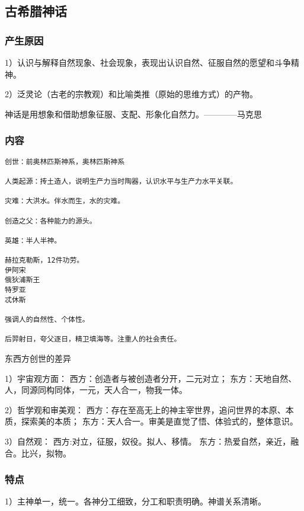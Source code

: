 \documentclass[UTF8]{../RepresentationUniverse}
\begin{document}
\subsection{古希腊神话}

\subsubsection{产生原因}

1）认识与解释自然现象、社会现象，表现出认识自然、征服自然的愿望和斗争精神。

2）泛灵论（古老的宗教观）和比喻类推（原始的思维方式）的产物。

神话是用想象和借助想象征服、支配、形象化自然力。————马克思


\subsubsection{内容}

\begin{lstlisting}
创世：前奥林匹斯神系，奥林匹斯神系

人类起源：抟土造人，说明生产力当时陶器，认识水平与生产力水平关联。

灾难：大洪水。伴水而生，水的灾难。

创造之父：各种能力的源头。

英雄：半人半神。

赫拉克勒斯，12件功劳。
伊阿宋
俄狄浦斯王
特罗亚
忒休斯

强调人的自然性、个体性。

后羿射日，夸父逐日，精卫填海等。注重人的社会责任。
\end{lstlisting}


\begin{proposition}
    东西方创世的差异

    1）宇宙观方面：
    西方：创造者与被创造者分开，二元对立；
    东方：天地自然、人，同源同构同体，一元，天人合一，物我一体。

    2）哲学观和审美观：
    西方：存在至高无上的神主宰世界，追问世界的本原、本质，探索美的本质；
    东方：天人合一。审美是直觉了悟、体验式的，整体意识。

    3）自然观：
    西方:对立，征服，奴役。拟人、移情。
    东方：热爱自然，亲近，融合。比兴，拟物。
\end{proposition}




\subsubsection{特点}
1）主神单一，统一。各神分工细致，分工和职责明确。神谱关系清晰。
\end{document}
